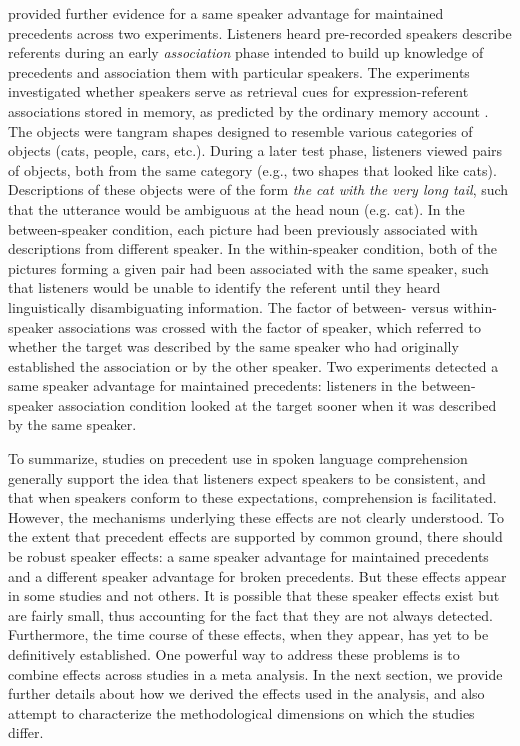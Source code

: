 \documentclass[doc,fignum,apacite,floatsintext]{apa6}
\begin{document}
 provided further evidence for a same speaker advantage for maintained precedents across two experiments.  Listeners heard pre-recorded speakers describe referents during an early \textit{association} phase intended to build up knowledge of precedents and association them with particular speakers.  The experiments investigated whether speakers serve as retrieval cues for expression-referent associations stored in memory, as predicted by the ordinary memory account \cite{hortongerrig05a}.  The objects were tangram shapes designed to resemble various categories of objects (cats, people, cars, etc.).  During a later test phase, listeners viewed pairs of objects, both from the same category (e.g., two shapes that looked like cats).  Descriptions of these objects were of the form \textit{the cat with the very long tail}, such that the utterance would be ambiguous at the head noun (e.g. cat).  In the between-speaker condition, each picture had been previously associated with descriptions from different speaker.  In the within-speaker condition, both of the pictures forming a given pair had been associated with the same speaker, such that listeners would be unable to identify the referent until they heard linguistically disambiguating information.  The factor of between- versus within-speaker associations was crossed with the factor of speaker, which referred to whether the target was described by the same speaker who had originally established the association or by the other speaker.  Two experiments detected a same speaker advantage for maintained precedents: listeners in the between-speaker association condition looked at the target sooner when it was described by the same speaker.

To summarize, studies on precedent use in spoken language comprehension generally support the idea that listeners expect speakers to be consistent, and that when speakers conform to these expectations, comprehension is facilitated.  However, the mechanisms underlying these effects are not clearly understood.  To the extent that precedent effects are supported by common ground, there should be robust speaker effects: a same speaker advantage for maintained precedents and a different speaker advantage for broken precedents.  But these effects appear in some studies and not others.  It is possible that these speaker effects exist but are fairly small, thus accounting for the fact that they are not always detected.  Furthermore, the time course of these effects, when they appear, has yet to be definitively established.  One powerful way to address these problems is to combine effects across studies in a meta analysis.  In the next section, we provide further details about how we derived the effects used in the analysis, and also attempt to characterize the methodological dimensions on which the studies differ.
\end{document}
